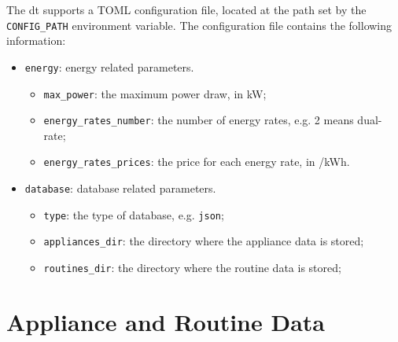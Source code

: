 The \acrshort{dt} supports a TOML configuration file, located at the path set by the \texttt{CONFIG\_PATH} environment variable. The configuration file contains the following information:
\begin{itemize}
    \item \texttt{energy}: energy related parameters.
        \begin{itemize}
            \item \texttt{max\_power}: the maximum power draw, in kW;
            \item \texttt{energy\_rates\_number}: the number of energy rates, e.g. 2 means dual-rate;
            \item \texttt{energy\_rates\_prices}: the price for each energy rate, in \texteuro/kWh.
        \end{itemize}
    \item \texttt{database}: database related parameters.
        \begin{itemize}
            \item \texttt{type}: the type of database, e.g. \texttt{json};
            \item \texttt{appliances\_dir}: the directory where the appliance data is stored;
            \item \texttt{routines\_dir}: the directory where the routine data is stored;
        \end{itemize}
\end{itemize}

\section{Appliance and Routine Data}

